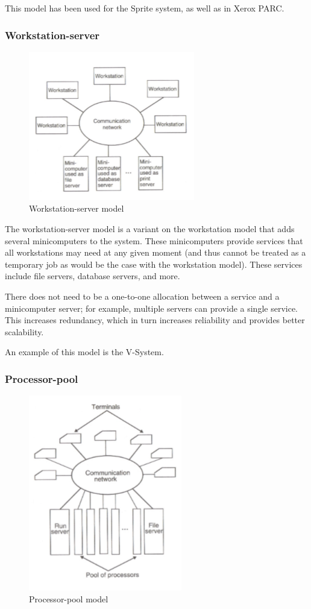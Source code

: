 This model has been used for the Sprite system, as well as in Xerox PARC.

\subsubsection{Workstation-server}
\begin{figure}
\centering
\includegraphics[width=0.5\linewidth]{screenshot005}
\caption{Workstation-server model}
\label{fig:screenshot005}
\end{figure}

The workstation-server model is a variant on the workstation model that adds several minicomputers to the system. These minicomputers provide services that all workstations may need at any given moment (and thus cannot be treated as a temporary job as would be the case with the workstation model). These services include file servers, database servers, and more.

There does not need to be a one-to-one allocation between a service and a minicomputer server; for example, multiple servers can provide a single service. This increases redundancy, which in turn increases reliability and provides better scalability.

An example of this model is the V-System.

\subsubsection{Processor-pool}
\begin{figure}[h]
\centering
\includegraphics[width=0.5\linewidth]{screenshot006}
\caption{Processor-pool model}
\label{fig:screenshot006}
\end{figure}

